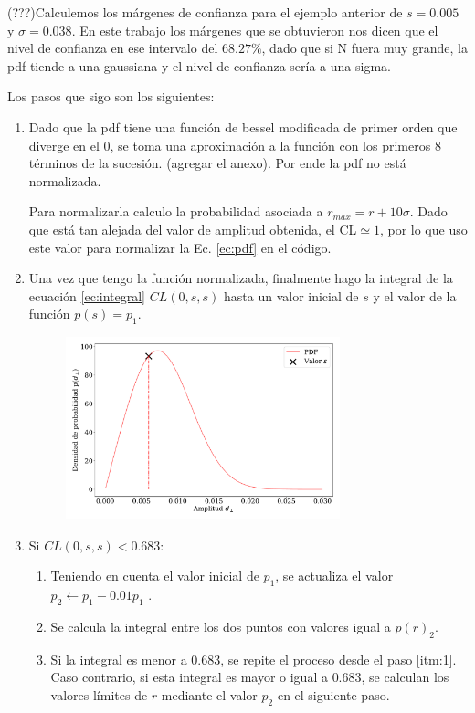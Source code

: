 (???)Calculemos los márgenes de confianza para el ejemplo anterior de $s=0.005$ y $\sigma=0.038$. En este trabajo los márgenes que se obtuvieron nos dicen que el nivel de confianza en ese intervalo del $68.27\%$, dado que si N fuera muy grande, la pdf tiende a una gaussiana y el nivel de confianza sería a una sigma.


Los pasos que sigo son los siguientes: 

\begin{enumerate}
    \item 
    Dado que la pdf tiene una función de bessel modificada de primer orden que diverge en el 0, se toma una aproximación a la función con los primeros 8 términos de la sucesión. (agregar el anexo). Por ende la pdf no está normalizada. 
    
    Para normalizarla calculo la probabilidad asociada a $r_{max}=r +  10\sigma$. Dado que está tan alejada del valor de amplitud obtenida, el CL$\simeq 1$, por lo que uso este valor para normalizar  la Ec. \ref{ec:pdf} en el código.
    \item Una vez que tengo la función normalizada, finalmente hago la integral de la ecuación \ref{ec:integral} $CL(0,s,s)$ hasta un valor inicial de $s$ y el valor de la función $p(s)=p_1$.
    \begin{figure}[H]
        \begin{small}
            \begin{center}
                \includegraphics[width=0.75\textwidth]{bessel_prob_value_s.pdf}
            \end{center}
            \caption{}
        \end{small}
    \end{figure}
    \item Si $CL(0,s,s)< 0.683$:
    \begin{enumerate}
        \item Teniendo en cuenta el valor inicial de $p_1$, se actualiza el valor  $p_2 \leftarrow p_1 - 0.01 p_1$ \label{itm:1}.
        \item Se calcula la integral entre los dos puntos con valores igual a $p(r)_2$. 
        \item \label{itm:3} Si la integral es menor a $0.683$, se repite el proceso desde el paso \ref{itm:1}. Caso contrario, si esta integral es mayor o igual a $0.683$, se calculan los valores límites de $r$ mediante el valor $p_2$ en el siguiente paso. 


\end{enumerate}
\end{enumerate}
